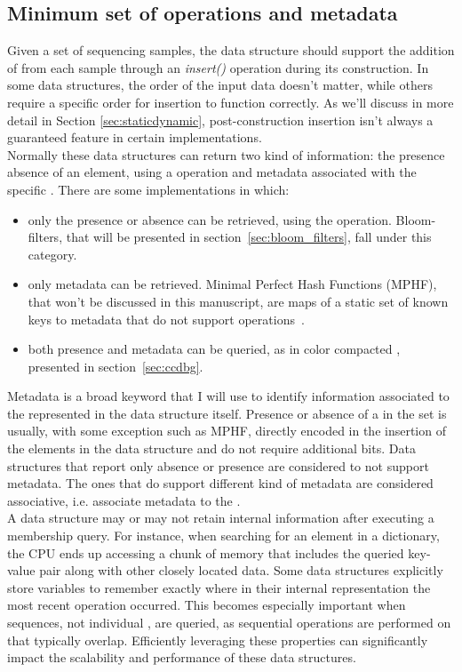 \subsection{Minimum set of operations and metadata}
Given a set of sequencing samples, the data structure should support the addition of \kmers from each sample through an \emph{insert()}  operation during its construction. In some data structures, the order of the input data doesn't matter, while others require a specific order for insertion to function correctly. As we'll discuss in more detail in Section \ref{sec:staticdynamic}, post-construction insertion isn't always a guaranteed feature in certain implementations.\\
Normally these data structures can return two kind of information: the presence absence of an element, using a \memb operation and metadata associated with the specific \kmer. There are some implementations in which:
\begin{itemize}
	\item only the presence or absence can be retrieved, using the \memb operation. Bloom-filters, that will be presented in section~\ref{sec:bloom_filters}, fall under this category.
	\item only metadata can be retrieved. Minimal Perfect Hash Functions (MPHF), that won't be discussed in this manuscript, are maps of a static set of known keys to metadata that do not support \memb operations~\cite{mphf}.
	\item both presence and metadata can be queried, as in color compacted \dbg, presented in section~\ref{sec:ccdbg}.
\end{itemize}
Metadata is a broad keyword that I will use to identify information associated to the \kmers represented in the data structure itself. Presence or absence of a \kmer in the set is usually, with some exception such as \gls{MPHF}, directly encoded in the insertion of the elements in the data structure and do not require additional bits. Data structures that report only absence or presence are considered to not support metadata. The ones that do support different kind of metadata are considered associative, i.e. associate metadata to the \kmers.\\
A data structure may or may not retain internal information after executing a membership query. For instance, when searching for an element in a dictionary, the CPU ends up accessing a chunk of memory that includes the queried key-value pair along with other closely located data. Some data structures explicitly store variables to remember exactly where in their internal representation the most recent \memb operation occurred. This becomes especially important when sequences, not individual \kmers, are queried, as sequential \memb operations are performed on \kmers that typically overlap. Efficiently leveraging these properties can significantly impact the scalability and performance of these data structures.

